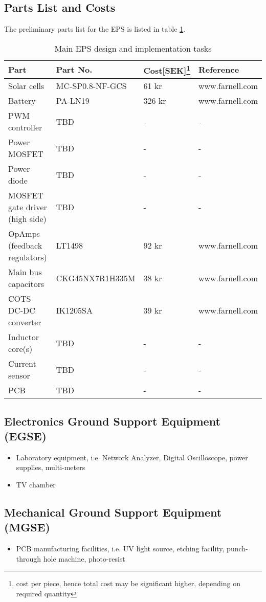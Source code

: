 \subsection{Parts List and Costs}

The preliminary parts list for the \ac{EPS} is listed in table \ref{tab:parts_list}.

\begin{table}[H]
\centering
\caption{Main \ac{EPS} design and implementation tasks}
\label{tab:parts_list}
\begin{minipage}{\textwidth}
\centering
\begin{tabular}{|m{}|m{} |m{}|m{}|}
\hline
\textbf{Part} & \textbf{Part No.} & \textbf{Cost[SEK]}\footnote{cost per piece, hence total cost may be significant higher, depending on required quantity} & \textbf{Reference} \\
\hline
Solar cells & MC-SP0.8-NF-GCS & 61 kr & www.farnell.com\\
Battery & PA-LN19 & 326 kr & www.farnell.com\\
PWM controller & \ac{TBD} & - & - \\
Power MOSFET & TBD & - & - \\
Power diode & TBD & - & - \\
MOSFET gate driver (high side) & TBD & - & - \\
OpAmps (feedback regulators) & LT1498 & 92 kr & www.farnell.com \\
Main bus capacitors & CKG45NX7R1H335M & 38 kr & www.farnell.com \\
COTS DC-DC converter & IK1205SA & 39 kr & www.farnell.com\\
Inductor core(s) & TBD & - & -\\
Current sensor & TBD & - & -\\
PCB & TBD & - & - \\
\hline
\end{tabular}\par
\vspace{-0.75\skip\footins}
\renewcommand{\footnoterule}{}
\end{minipage}
\end{table}

\subsection{Electronics Ground Support Equipment (EGSE)}
%
%
\begin{itemize}
\item Laboratory equipment, i.e. Network Analyzer, Digital Oscilloscope, power supplies, multi-meters
\item \ac{TV} chamber
\end{itemize}
%
\subsection{Mechanical Ground Support Equipment (MGSE)}
%
\begin{itemize}
\item \ac{PCB} manufacturing facilities, i.e. UV light source, etching facility, punch-through hole machine, photo-resist
\end{itemize}
%